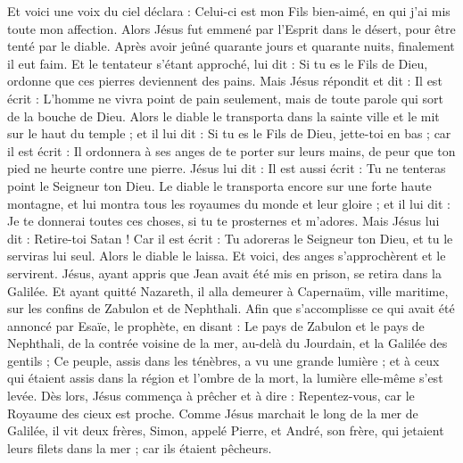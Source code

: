 \begin{multicols}{2}
Et voici une voix du ciel déclara : Celui-ci est mon Fils bien-aimé, en qui j'ai mis toute mon affection.
\VerseOne{}Alors Jésus fut emmené par l'Esprit dans le désert, pour être tenté par le diable.
Après avoir jeûné quarante jours et quarante nuits, finalement il eut faim.
Et le tentateur s'étant approché, lui dit : Si tu es le Fils de Dieu, ordonne que ces pierres deviennent des pains.
Mais Jésus répondit et dit : Il est écrit : L'homme ne vivra point de pain seulement, mais de toute parole qui sort de la bouche de Dieu.
Alors le diable le transporta dans la sainte ville et le mit sur le haut du temple ;
et il lui dit : Si tu es le Fils de Dieu, jette-toi en bas ; car il est écrit : Il ordonnera à ses anges de te porter sur leurs mains, de peur que ton pied ne heurte contre une pierre.
Jésus lui dit : Il est aussi écrit : Tu ne tenteras point le Seigneur ton Dieu.
Le diable le transporta encore sur une forte haute montagne, et lui montra tous les royaumes du monde et leur gloire ;
et il lui dit : Je te donnerai toutes ces choses, si tu te prosternes et m'adores.
Mais Jésus lui dit : Retire-toi Satan ! Car il est écrit : Tu adoreras le Seigneur ton Dieu, et tu le serviras lui seul.
Alors le diable le laissa. Et voici, des anges s'approchèrent et le servirent.
Jésus, ayant appris que Jean avait été mis en prison, se retira dans la Galilée.
Et ayant quitté Nazareth, il alla demeurer à Capernaüm, ville maritime, sur les confins de Zabulon et de Nephthali.
Afin que s'accomplisse ce qui avait été annoncé par Esaïe, le prophète, en disant :
Le pays de Zabulon et le pays de Nephthali, de la contrée voisine de la mer, au-delà du Jourdain, et la Galilée des gentils ;
Ce peuple, assis dans les ténèbres, a vu une grande lumière ; et à ceux qui étaient assis dans la région et l'ombre de la mort, la lumière elle-même s'est levée.
Dès lors, Jésus commença à prêcher et à dire : Repentez-vous, car le Royaume des cieux est proche.
Comme Jésus marchait le long de la mer de Galilée, il vit deux frères, Simon, appelé Pierre, et André, son frère, qui jetaient leurs filets dans la mer ; car ils étaient pêcheurs.

\end{multicols}
